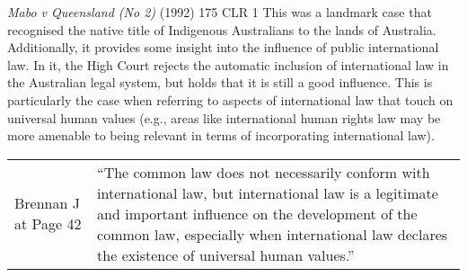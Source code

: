 \begin{casedetails}{\textit{Mabo v Queensland (No 2)} (1992) 175 CLR 1}\label{case: Mabo}
    \flushleft
    This was a landmark case that recognised the native title of Indigenous Australians to the lands of Australia. Additionally, it provides some insight into the influence of public international law. In it, the High Court rejects the automatic inclusion of international law in the Australian legal system, but holds that it is still a good influence. This is particularly the case when referring to aspects of international law that touch on universal human values (e.g., areas like international human rights law may be more amenable to being relevant in terms of incorporating international law).

    \begin{longtable}{p{}|>{\raggedright\arraybackslash}p{}}
        Brennan J at Page 42 & ``The common law does not necessarily conform with international law, but international law is a legitimate and important influence on the development of the common law, especially when international law declares the existence of universal human values.''
    \end{longtable}
\end{casedetails}

